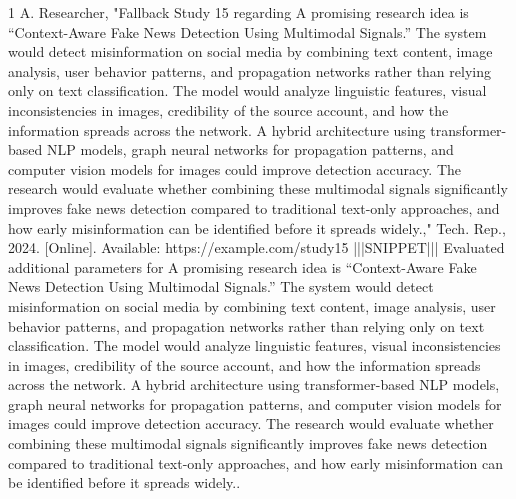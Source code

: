 \documentclass[conference]{IEEEtran}
\begin{document}
\begin{thebibliography}{1}
A. Researcher, "Fallback Study 15 regarding A promising research idea is “Context-Aware Fake News Detection Using Multimodal Signals.” The system would detect misinformation on social media by combining text content, image analysis, user behavior patterns, and propagation networks rather than relying only on text classification. The model would analyze linguistic features, visual inconsistencies in images, credibility of the source account, and how the information spreads across the network. A hybrid architecture using transformer-based NLP models, graph neural networks for propagation patterns, and computer vision models for images could improve detection accuracy. The research would evaluate whether combining these multimodal signals significantly improves fake news detection compared to traditional text-only approaches, and how early misinformation can be identified before it spreads widely.," Tech. Rep., 2024. [Online]. Available: https://example.com/study15 |||SNIPPET||| Evaluated additional parameters for A promising research idea is “Context-Aware Fake News Detection Using Multimodal Signals.” The system would detect misinformation on social media by combining text content, image analysis, user behavior patterns, and propagation networks rather than relying only on text classification. The model would analyze linguistic features, visual inconsistencies in images, credibility of the source account, and how the information spreads across the network. A hybrid architecture using transformer-based NLP models, graph neural networks for propagation patterns, and computer vision models for images could improve detection accuracy. The research would evaluate whether combining these multimodal signals significantly improves fake news detection compared to traditional text-only approaches, and how early misinformation can be identified before it spreads widely..
\end{thebibliography}
\end{document}
